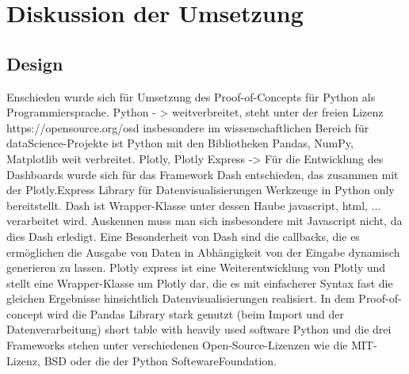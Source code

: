 \chapter{Diskussion der Umsetzung}
\label{chap:five}
\section{Design}
Enschieden wurde sich für Umsetzung  des Proof-of-Concepts für Python als Programmiersprache.
Python - > weitverbreitet, steht unter der freien Lizenz https://opensource.org/osd
insbesondere im wissenschaftlichen Bereich für dataScience-Projekte ist Python mit den Bibliotheken Pandas, NumPy, Matplotlib
weit verbreitet. 
Plotly, Plotly Express ->
Für die Entwicklung des Dashboards wurde sich für das Framework Dash entschieden, das zusammen mit der Plotly.Express Library für Datenvisualisierungen  Werkzeuge in Python only bereitstellt.  Dash ist Wrapper-Klasse unter dessen Haube javascript, html, ... verarbeitet wird. Auskennen muss man sich insbesondere mit Javascript nicht, da dies Dash erledigt.
Eine Besonderheit von Dash sind die callbacks, die es ermöglichen die Ausgabe von Daten in Abhängigkeit von der Eingabe dynamisch generieren zu lassen.
Plotly express ist eine Weiterentwicklung von Plotly und stellt eine Wrapper-Klasse um Plotly dar, die es mit einfacherer Syntax fast die gleichen Ergebnisse hinsichtlich Datenvisualisierungen realisiert.
In dem Proof-of-concept wird die Pandas Library stark genutzt (beim Import und der Datenverarbeitung)
short table with heavily used software
Python und die drei Frameworks stehen unter verschiedenen Open-Source-Lizenzen wie die MIT-Lizenz, BSD oder die der Python SoftewareFoundation.

